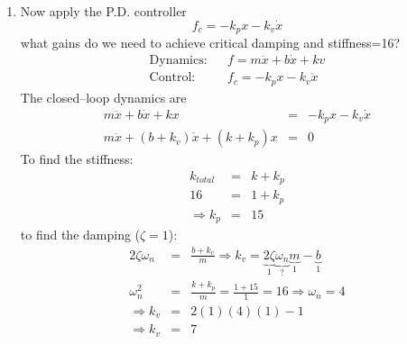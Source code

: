 \documentclass[]{article}
\begin{document}
\begin{enumerate}
\item Now apply the P.D. controller
\begin{displaymath}
 f_{c} = -k_{p}x-k_{v}\dot{x}
\end{displaymath}
what gains do we need to achieve critical damping and stiffness=16?
\begin{eqnarray}
 \text{Dynamics:} && f = m\ddot{x}+b\dot{x}+kv \nonumber \\
 \text{Control:} && f_{c} = -k_{p}x - k_{v}\dot{x} \nonumber
\end{eqnarray}
The closed--loop dynamics are
\begin{eqnarray}
 m\ddot{x}+b\dot{x}+kx & = & -k_{p}x-k_{v}\dot{x} \nonumber \\
 m\ddot{x} + (b+k_{v})\dot{x} + (k+k_{p})x & = & 0 \nonumber
\end{eqnarray}
To find the stiffness:
\begin{eqnarray}
k_{total} & = & k+k_{p} \nonumber \\
16 & = & 1 + k_{p} \nonumber \\
\Rightarrow k_{p} & = & 15 \nonumber
\end{eqnarray}
to find the damping ($\zeta=1$):
\begin{eqnarray}
 2\zeta\omega_{n} & = & \frac{b+k_{v}}{m} \Rightarrow k_{v} = \underbrace{2\zeta}_{1}\underbrace{\omega_{n}}_{?}\underbrace{m}_{1} - \underbrace{b}_{1} \nonumber \\
 \omega_{n}^{2} & = & \frac{k+k_{p}}{m} = \frac{1+15}{1}=16\Rightarrow \omega_{n}=4 \nonumber \\
 \Rightarrow k_{v} & = & 2(1)(4)(1)-1 \nonumber \\
 \Rightarrow k_{v} & = & 7 \nonumber 
\end{eqnarray}


\end{enumerate}
\end{document}
